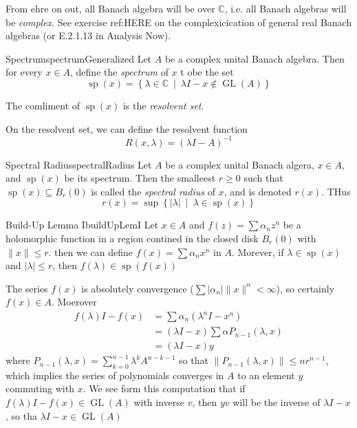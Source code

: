 \documentclass[oneside]{book}
\newcommand{\C}{\mathbb{C}}
\newcommand{\sse}{\subseteq}
\renewcommand{\sp}{\operatorname{sp}}
\newcommand{\GL}{\operatorname{GL}}
\newcommand{\set}[2]{\left\{#1 \ \middle|\ #2\right\}}
\begin{document}
From ehre on out, all Banach algebra will be over $\C$, i.e. all Banach algebras will be \emph{complex}. See exercise
ref:HERE on the complexicication of general real Banach algebras (or E.2.1.13 in Analysis Now).

\begin{defn}{Spectrum}{spectrumGeneralized}
	Let $A$ be a complex unital Banach algebra. Then for every $x \in A$, define the \emph{spectrum} of $x$ t obe
	the set
	\[
		\sp(x) = \set{\lambda \in \C}{\lambda I -x \notin \GL(A)}
	\]

	The comliment of $\sp(x)$ is the \emph{resolvent set}.
\end{defn}

On the resolvent set, we can define the resolvent function
\[
	R(x, \lambda) = (\lambda I - A)^{-1}
\]

\begin{defn}{Spectral Radius}{spectralRadius}
	Let $A$ be a complex unital Banach algera, $x \in A$, and $\sp(x)$ be its spectrum. Then the smalleest $r \ge
	0$ such that $\sp(x) \sse B_r(0)$ is called the \emph{spectral radius} of $x$, and is denoted
	$r(x)$. THus
	\[
		r(x) = \sup\set{|\lambda|}{\lambda \in \sp(x)}
	\]
\end{defn}

\begin{lem}{Build-Up Lemma I}{buildUpLemI}
	Let $x \in A$ and $f(z) = \sum \alpha_nz^n$ be a holomorphic function in a region contined in the closed disk
	$B_r(0)$ with $\|x\| \le r$. then we can define $f(x) = \sum \alpha_n x^n$ in $A$. Morever, if $\lambda \in
	\sp(x)$ and $|\lambda| \le r$, then $f(\lambda) \in \sp(f(x))$
\end{lem}

\begin{Proof}
	The series $f(x)$ is absolutely convergence ($\sum |\alpha_n| \|x\|^n <\infty$), so certainly $f(x)
	\in A$. Moerover
	\begin{align*}
		f(\lambda)I - f(x) &= \sum \alpha_n(\lambda^n I-x^n)\\
						   &= (\lambda I -x)\sum \alpha P_{n-1}(\lambda, x)\\
						   &= (\lambda I-x)y
	\end{align*}
	where $P_{n-1}(\lambda, x) = \sum_{k=0}^{n-1} \lambda^k A^{n-k-1}$ so that $\|P_{n-1}(\lambda, x)\| \le
	nr^{n-1}$, which implies the series of polynomials converges in $A$ to an element $y$ commuting with $x$. We see
	form this computation that if $f(\lambda) I - f(x) \in \GL(A)$ with inverse $v$, then $yv$ will be the
	inverse of $\lambda I - x$,  so tha $\lambda I - x \in \GL(A)$
\end{Proof}
\end{document}
